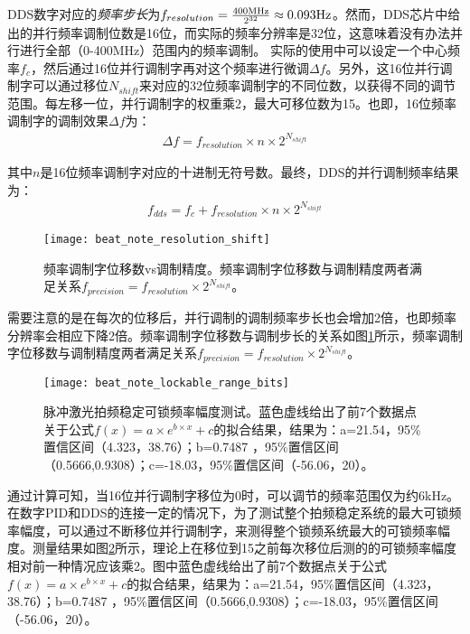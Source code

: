 DDS数字对应的\emph{频率步长}为$f_{resolution}=\frac{400\textnormal{MHz}}{2^{32}}\approx0.093\textnormal{Hz}$。然而，DDS芯片中给出的并行频率调制位数是16位，而实际的频率分辨率是32位，这意味着没有办法并行进行全部（0-400MHz）范围内的频率调制。
实际的使用中可以设定一个中心频率$f_{c}$，然后通过16位并行调制字再对这个频率进行微调$\Delta f$。另外，这16位并行调制字可以通过移位$N_{shift}$来对应的32位频率调制字的不同位数，以获得不同的调节范围。每左移一位，并行调制字的权重乘2，最大可移位数为15。也即，16位频率调制字的调制效果$\Delta f$为：
\begin{align}
    \Delta f=f_{resolution}\times n \times 2^{N_{shift}}
\end{align}

其中$n$是16位频率调制字对应的十进制无符号数。最终，DDS的并行调制频率结果为：
\begin{align}
    f_{dds}=f_c+f_{resolution}\times n \times 2^{N_{shift}}
\end{align}

\begin{figure}
    \centering
    \caption[频率调制字位移数vs调制精度
    ]{频率调制字位移数vs调制精度。频率调制字位移数与调制精度两者满足关系$f_{precision}=f_{resolution}\times2^{N_{shift}}$。
    \label{fig:beat_note_resolution_shift}}
    \texttt{[image: beat\_note\_resolution\_shift]}
\end{figure}

需要注意的是在每次的位移后，并行调制的调制频率步长也会增加2倍，也即频率分辨率会相应下降2倍。频率调制字位移数与调制步长的关系如图\ref{fig:beat_note_resolution_shift}所示，频率调制字位移数与调制精度两者满足关系$f_{precision}=f_{resolution}\times2^{N_{shift}}$。



\begin{figure}
    \centering
    \caption[脉冲激光拍频稳定可锁频率幅度测试]{脉冲激光拍频稳定可锁频率幅度测试。蓝色虚线给出了前7个数据点关于公式$f(x)=a\times e^{b\times x}+c$的拟合结果，结果为：a=21.54，95\%置信区间（4.323，38.76）；b=0.7487 ，95\%置信区间（0.5666,0.9308）；c=-18.03，95\%置信区间（-56.06，20）。\label{fig:beat_note_lockable_range_bits}}
    \texttt{[image: beat\_note\_lockable\_range\_bits]}
\end{figure}

通过计算可知，当16位并行调制字移位为0时，可以调节的频率范围仅为约6kHz。在数字PID和DDS的连接一定的情况下，为了测试整个拍频稳定系统的最大可锁频率幅度，可以通过不断移位并行调制字，来测得整个锁频系统最大的可锁频率幅度。测量结果如图\ref{fig:beat_note_lockable_range_bits}所示，理论上在移位到15之前每次移位后测的的可锁频率幅度相对前一种情况应该乘2。图中蓝色虚线给出了前7个数据点关于公式$f(x)=a\times e^{b\times x}+c$的拟合结果，结果为：a=21.54，95\%置信区间（4.323，38.76）；b=0.7487 ，95\%置信区间（0.5666,0.9308）；c=-18.03，95\%置信区间（-56.06，20）。

